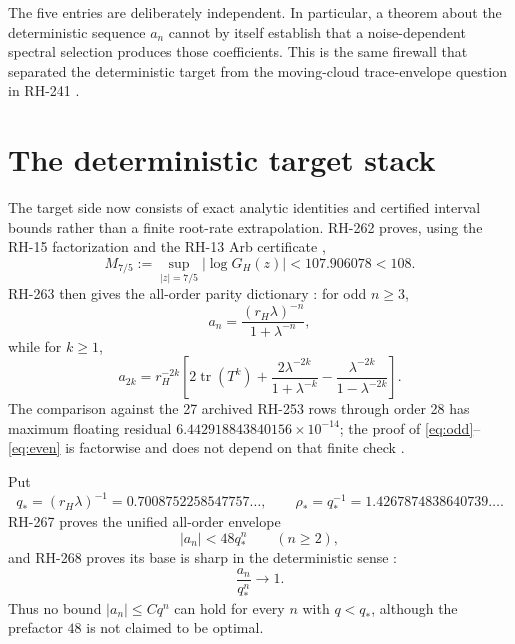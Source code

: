\documentclass[11pt]{article}
\theoremstyle{definition}
\theoremstyle{remark}
\begin{document}
The five entries are deliberately independent.  In particular, a theorem
about the deterministic sequence $a_n$ cannot by itself establish that a
noise-dependent spectral selection produces those coefficients.  This is the
same firewall that separated the deterministic target from the moving-cloud
trace-envelope question in RH-241 \citep{WangRH241}.

\section{The deterministic target stack}

The target side now consists of exact analytic identities and certified
interval bounds rather than a finite root-rate extrapolation.  RH-262 proves,
using the RH-15 factorization and the RH-13 Arb certificate
\citep{WangRH13,WangRH15,WangRH262},
\begin{equation}
 M_{7/5}:=\sup_{|z|=7/5}|\log G_H(z)|<107.906078<108.
 \label{eq:boundary}
\end{equation}
RH-263 then gives the all-order parity dictionary \citep{WangRH263}:
for odd $n\ge3$,
\begin{equation}
 a_n=\frac{(r_H\lambda)^{-n}}{1+\lambda^{-n}},
 \label{eq:odd}
\end{equation}
while for $k\ge1$,
\begin{equation}
 a_{2k}=r_H^{-2k}\left[
 2\operatorname{tr}(T^k)+\frac{2\lambda^{-2k}}{1+\lambda^{-k}}
 -\frac{\lambda^{-2k}}{1-\lambda^{-2k}}
 \right].
 \label{eq:even}
\end{equation}
The comparison against the 27 archived RH-253 rows through order 28 has
maximum floating residual $6.442918843840156\times10^{-14}$; the proof of
\eqref{eq:odd}--\eqref{eq:even} is factorwise and does not depend on that
finite check \citep{WangRH253}.

Put
\begin{equation}
 q_*=(r_H\lambda)^{-1}=0.7008752258547757\ldots,
 \qquad \rho_*=q_*^{-1}=1.4267874838640739\ldots .
 \label{eq:qstar}
\end{equation}
RH-267 proves the unified all-order envelope
\begin{equation}
 |a_n|<48q_*^n\qquad(n\ge2),
 \label{eq:envelope}
\end{equation}
and RH-268 proves its base is sharp in the deterministic sense
\citep{WangRH267,WangRH268}:
\begin{equation}
 \frac{a_n}{q_*^n}\longrightarrow1.
 \label{eq:sharp}
\end{equation}
Thus no bound $|a_n|\le Cq^n$ can hold for every $n$ with $q<q_*$, although
the prefactor $48$ is not claimed to be optimal.
\end{document}
